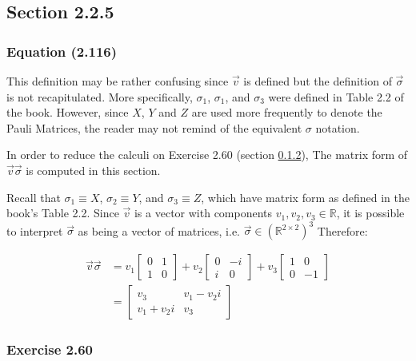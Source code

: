 \subsection{Section 2.2.5}
\subsubsection{Equation (2.116)}

This definition may be rather confusing since $\vec{v}$ is defined
but the definition of $\vec{\sigma}$ is not recapitulated.
More specifically, $\sigma_1$, $\sigma_1$, and $\sigma_3$ were
defined in Table 2.2 of the book.
However, since $X$, $Y$ and $Z$ are used more frequently to
denote the Pauli Matrices, the reader may not remind of the
equivalent $\sigma$ notation.

In order to reduce the calculi on Exercise 2.60
(section \ref{sec:nielsen_and_chuang_exercise_2_60}),
The matrix form of $\vec{v} \vec{\sigma}$ is computed in this section.

Recall that $\sigma_1 \equiv X$, $\sigma_2 \equiv Y$,
and $\sigma_3 \equiv Z$, which have matrix form as defined in
the book's Table 2.2.
Since $\vec{v}$ is a vector with components
$v_1, v_2, v_3 \in \mathbb{R}$,
it is possible to interpret $\vec{\sigma}$ as being a vector of
matrices, i.e. $\vec{\sigma} \in (\mathbb{R}^{2 \times 2})^3$
Therefore:

\begin{align}
    \vec{v} \vec{\sigma} &= v_1 \left[ \begin{matrix}
        0 & 1 \\ 1 & 0 \end{matrix}\right] +
        v_2 \left[ \begin{matrix}
        0 & -i \\ i & 0 \end{matrix} \right] +
        v_3 \left[ \begin{matrix}
        1 & 0 \\ 0 & -1\end{matrix} \right]
        \\
        &= \left[ \begin{matrix}
        v_3 & v_1 -v_2 i \\ v_1 + v_2 i & v_3
        \end{matrix} \right]
\end{align}

\subsubsection{Exercise 2.60}
\label{sec:nielsen_and_chuang_exercise_2_60}
